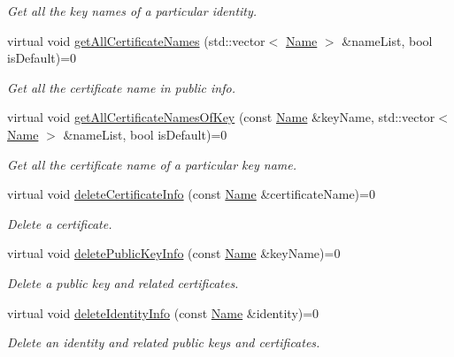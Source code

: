 \begin{DoxyCompactItemize}
\begin{DoxyCompactList}\small\item\em Get all the key names of a particular identity. \end{DoxyCompactList}\item 
virtual void \hyperlink{classndn_1_1SecPublicInfo_a986226683c039d2ea1293c43cb3b7de2}{get\+All\+Certificate\+Names} (std\+::vector$<$ \hyperlink{classndn_1_1Name}{Name} $>$ \&name\+List, bool is\+Default)=0
\begin{DoxyCompactList}\small\item\em Get all the certificate name in public info. \end{DoxyCompactList}\item 
virtual void \hyperlink{classndn_1_1SecPublicInfo_ad973ee64663941e934f59f7bce12c2ac}{get\+All\+Certificate\+Names\+Of\+Key} (const \hyperlink{classndn_1_1Name}{Name} \&key\+Name, std\+::vector$<$ \hyperlink{classndn_1_1Name}{Name} $>$ \&name\+List, bool is\+Default)=0
\begin{DoxyCompactList}\small\item\em Get all the certificate name of a particular key name. \end{DoxyCompactList}\item 
virtual void \hyperlink{classndn_1_1SecPublicInfo_ad141124b6f9731169a96c5c8f9c0d95e}{delete\+Certificate\+Info} (const \hyperlink{classndn_1_1Name}{Name} \&certificate\+Name)=0
\begin{DoxyCompactList}\small\item\em Delete a certificate. \end{DoxyCompactList}\item 
virtual void \hyperlink{classndn_1_1SecPublicInfo_ab1fc90cf485947c8c30c7ac0fa7f740c}{delete\+Public\+Key\+Info} (const \hyperlink{classndn_1_1Name}{Name} \&key\+Name)=0
\begin{DoxyCompactList}\small\item\em Delete a public key and related certificates. \end{DoxyCompactList}\item 
virtual void \hyperlink{classndn_1_1SecPublicInfo_ab50e8b2a7716e6a74985c9a444a0e9d7}{delete\+Identity\+Info} (const \hyperlink{classndn_1_1Name}{Name} \&identity)=0
\begin{DoxyCompactList}\small\item\em Delete an identity and related public keys and certificates. \end{DoxyCompactList}\item 

\end{DoxyCompactItemize}
